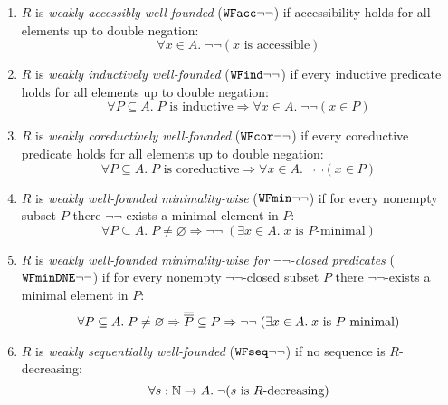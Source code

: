 \begin{definition} \label{def:WFweakproperties} \hfill 
  \begin{enumerate}
    \item $R$ is \emph{weakly accessibly well-founded} ($\mathtt{WFacc}{\lnot\lnot}$) if accessibility holds for all elements up to double negation:
      \[
        \forall x \in A.\; \lnot \lnot  (x \text{ is accessible})
      \]
    \item $R$ is \emph{weakly inductively well-founded} ($\mathtt{WFind}{\lnot\lnot}$) if every inductive predicate holds for all elements up to double negation:
      \[
        \forall P \subseteq A.\;\text{$P$ is inductive} \Rightarrow \forall x \in A.\; \lnot \lnot (x \in P)
      \]
    \item $R$ is \emph{weakly coreductively well-founded} ($\mathtt{WFcor}{\lnot\lnot}$) if every coreductive predicate holds for all elements up to double negation:
      \[
        \forall P \subseteq A.\;\text{$P$ is coreductive} \Rightarrow \forall x \in A.\; \lnot\lnot(x \in P)
      \]
    \item  $R$ is \emph{weakly well-founded minimality-wise} ($\mathtt{WFmin}{\lnot\lnot}$)
      if for every nonempty subset $P$ there $\lnot \lnot$-exists a minimal element in $P$:
      \[
        \forall P \subseteq A.\; P \neq \varnothing \Rightarrow \lnot \lnot \;
        (\exists x \in A.\; \text{$x$ is $P$-minimal})
      \]
    \item  $R$ is \emph{weakly well-founded minimality-wise for $\lnot \lnot$-closed predicates} ($\mathtt{WFminDNE}{\lnot\lnot}$)
      if for every nonempty $\lnot \lnot$-closed subset $P$ there $\lnot \lnot$-exists a minimal element in $P$:
      \[
        \forall P \subseteq A.\; P \neq \varnothing \Rightarrow \overline{\overline{P}} \subseteq P\Rightarrow \lnot \lnot \;
        (\exists x \in A.\; \text{$x$ is $P$-minimal})
      \]      
  \item $R$ is \emph{weakly sequentially well-founded} ($\mathtt{WFseq}{\lnot\lnot}$) if no sequence is $R$-decreasing:
    \[
      \forall s:\mathbb{N} \to A.\; \lnot \text{($s$ is $R$-decreasing)}
    \]
\end{enumerate} 
\end{definition}


